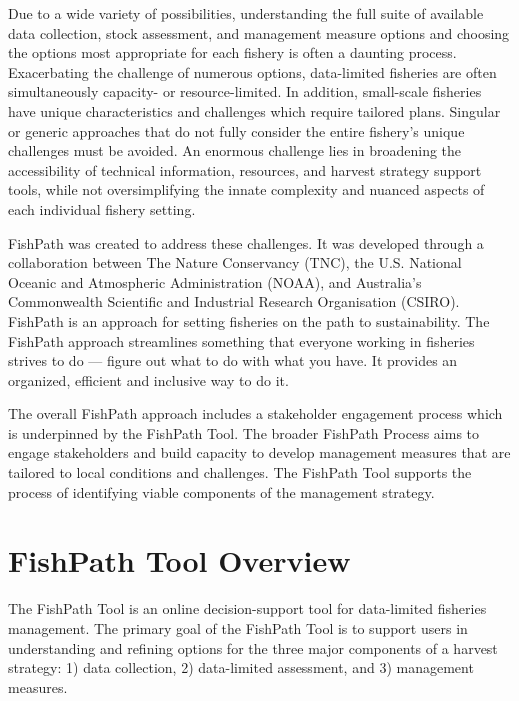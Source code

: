 \documentclass[
  11pt,
]{book}
\begin{document}
Due to a wide variety of possibilities, understanding the full suite of available data collection, stock assessment, and management measure options and choosing the options most appropriate for each fishery is often a daunting process. Exacerbating the challenge of numerous options, data-limited fisheries are often simultaneously capacity- or resource-limited. In addition, small-scale fisheries have unique characteristics and challenges which require tailored plans. Singular or generic approaches that do not fully consider the entire fishery's unique challenges must be avoided. An enormous challenge lies in broadening the accessibility of technical information, resources, and harvest strategy support tools, while not oversimplifying the innate complexity and nuanced aspects of each individual fishery setting.

FishPath was created to address these challenges. It was developed through a collaboration between The Nature Conservancy (TNC), the U.S. National Oceanic and Atmospheric Administration (NOAA), and Australia's Commonwealth Scientific and Industrial Research Organisation (CSIRO). FishPath is an approach for setting fisheries on the path to sustainability. The FishPath approach streamlines something that everyone working in fisheries strives to do --- figure out what to do with what you have. It provides an organized, efficient and inclusive way to do it.

The overall FishPath approach includes a stakeholder engagement process which is underpinned by the FishPath Tool. The broader FishPath Process aims to engage stakeholders and build capacity to develop management measures that are tailored to local conditions and challenges. The FishPath Tool supports the process of identifying viable components of the management strategy.

\hypertarget{fishpath-tool-overview}{%
\section{FishPath Tool Overview}\label{fishpath-tool-overview}}

The FishPath Tool is an online decision-support tool for data-limited fisheries management. The primary goal of the FishPath Tool is to support users in understanding and refining options for the three major components of a harvest strategy: 1) data collection, 2) data-limited assessment, and 3) management measures.
\end{document}
